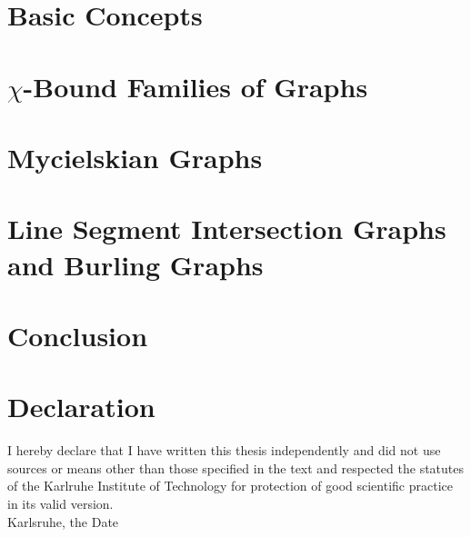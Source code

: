 \documentclass[12pt,a4paper]{scrartcl}
\theoremstyle{plain}
\theoremstyle{definition}
\numberwithin{equation}{section}
\theoremstyle{case}
\begin{document}
  \section{Basic Concepts}\label{secBC}
  
  \newpage 
  
  \section{$\chi$-Bound Families of Graphs}\label{secCR}
  
  \newpage
  
  \section{Mycielskian Graphs}\label{secMy}
  
  \newpage
  
  \section{Line Segment Intersection Graphs and Burling Graphs}\label{secLS}
  
  \newpage
  
  \section{Conclusion}\label{secConc}
  
  \newpage


  \listoffigures
  \newpage
 
  
  
      

  \newpage
  
  \thispagestyle{empty}


  \vspace*{8cm}


  \section*{Declaration}

I hereby declare that I have written this thesis independently and did not use sources or means other than those specified in the text
 and respected the statutes of the Karlruhe Institute of Technology for protection of good scientific practice in its valid version.
\\[2ex] 





  \noindent
Karlsruhe, the Date \\[5ex]

\end{document}
